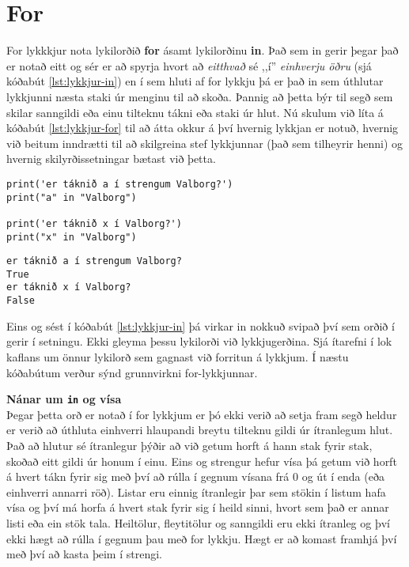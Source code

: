 \section{For}
For lykkkjur nota lykilorðið \textbf{for} ásamt lykilorðinu \textbf{in}.
Það sem in gerir þegar það er notað eitt og sér er að spyrja hvort að \textit{eitthvað} sé ,,í'' \textit{einhverju öðru} (sjá kóðabút \ref{lst:lykkjur-in}) en í sem hluti af for lykkju þá er það in sem úthlutar lykkjunni næsta staki úr menginu til að skoða.
Þannig að þetta býr til segð sem skilar sanngildi eða einu tilteknu tákni eða staki úr hlut.
Nú skulum við líta á kóðabút \ref{lst:lykkjur-for} til að átta okkur á því hvernig lykkjan er notuð, hvernig við beitum inndrætti til að skilgreina stef lykkjunnar (það sem tilheyrir henni) og hvernig skilyrðissetningar bætast við þetta.

\begin{lstlisting}[caption=Lykilorðið in, label=lst:lykkjur-in]
print('er táknið a í strengum Valborg?')
print("a" in "Valborg")

print('er táknið x í Valborg?')
print("x" in "Valborg")
\end{lstlisting}
\lstset{style=uttak}
\begin{lstlisting}
er táknið a í strengum Valborg?
True
er táknið x í Valborg?
False
\end{lstlisting}
\lstset{style=venjulegt}

Eins og sést í kóðabút \ref{lst:lykkjur-in} þá virkar in nokkuð svipað því sem orðið í gerir í setningu.
Ekki gleyma þessu lykilorði við lykkjugerðina.
Sjá ítarefni í lok kaflans um önnur lykilorð sem gagnast við forritun á lykkjum.
Í næstu kóðabútum verður sýnd grunnvirkni for-lykkjunnar.

\begin{itarefni}
	\textbf{Nánar um \texttt{in} og vísa}\\
	Þegar þetta orð er notað í for lykkjum er þó ekki verið að setja fram segð heldur er verið að úthluta einhverri hlaupandi breytu tilteknu gildi úr ítranlegum hlut.
	Það að hlutur sé ítranlegur þýðir að við getum horft á hann stak fyrir stak, skoðað eitt gildi úr honum í einu.
	Eins og strengur hefur vísa þá getum við horft á hvert tákn fyrir sig með því að rúlla í gegnum vísana frá 0 og út í enda (eða einhverri annarri röð).
	Listar eru einnig ítranlegir þar sem stökin í listum hafa vísa og því má horfa á hvert stak fyrir sig í heild sinni, hvort sem það er annar listi eða ein stök tala.
	Heiltölur, fleytitölur og sanngildi eru ekki ítranleg og því ekki hægt að rúlla í gegnum þau með for lykkju.
	Hægt er að komast framhjá því með því að kasta þeim í strengi.
\end{itarefni}

